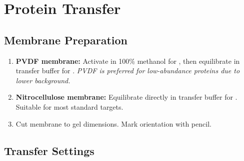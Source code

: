 \section{Protein Transfer}

\subsection{Membrane Preparation}

\begin{enumerate}
  \item \textbf{PVDF membrane:} Activate in 100\% methanol for ,
        then equilibrate in transfer buffer for . \textit{PVDF is
        preferred for low-abundance proteins due to lower background.}
  \item \textbf{Nitrocellulose membrane:} Equilibrate directly in transfer buffer
        for . Suitable for most standard targets.
  \item Cut membrane to gel dimensions. Mark orientation with pencil.
\end{enumerate}

\subsection{Transfer Settings}

